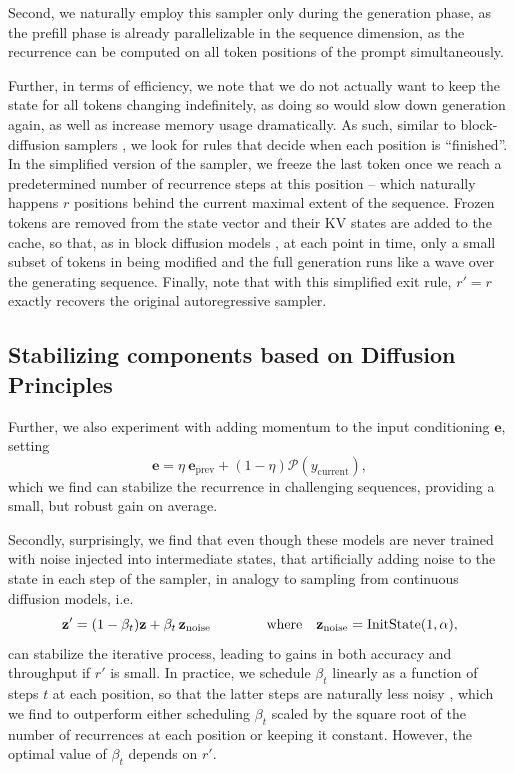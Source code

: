 \documentclass{article} %
\theoremstyle{definition}
\theoremstyle{plain}
\DeclareMathOperator{\InitState}{InitState}
\begin{document}
Second, we naturally employ this sampler only during the generation phase, as the prefill phase is already parallelizable in the sequence dimension, as the recurrence can be computed on all token positions of the prompt simultaneously.

Further, in terms of efficiency, we note that we do not actually want to keep the state for all tokens changing indefinitely, as doing so would slow down generation again, as well as increase memory usage dramatically. As such, similar to block-diffusion samplers \citep{arriola_block_2025}, we look for rules that decide when each position is ``finished''. In the simplified version of the sampler, we freeze the last token once we reach a predetermined number of recurrence steps at this position -- which naturally happens $r$ positions behind the current maximal extent of the sequence. Frozen tokens are removed from the state vector and their KV states are added to the cache, so that, as in block diffusion models \citep{arriola_block_2025}, at each point in time, only a small subset of tokens in being modified and the full generation runs like a wave over the generating sequence. Finally, note that with this simplified exit rule, $r'=r$ exactly recovers the original autoregressive sampler.

\subsection{Stabilizing components based on Diffusion Principles}
Further, we also experiment with adding momentum to the input conditioning $\mathbf{e}$, setting
\begin{equation}
    \mathbf{e} = \eta~\mathbf{e}_{\text{prev}} + (1-\eta) \mathcal{P}(y_\text{current}),
\end{equation}
which we find can stabilize the recurrence in challenging sequences, providing a small, but robust gain on average. 

Secondly, surprisingly, we find that even though these models are never trained with noise injected into intermediate states, that artificially adding noise to the state in each step of the sampler, in analogy to sampling from continuous diffusion models, i.e.
\begin{equation}
    \mathbf{z'} =  (1-\beta_t)\mathbf{z} + \beta_t\,\mathbf{z}_{\text{noise}} \qquad \qquad \textnormal{where}  \quad \mathbf{z}_{\text{noise}}=\InitState(1,\alpha),
\end{equation}
can stabilize the iterative process, leading to gains in both accuracy and throughput if $r'$ is small. In practice, we schedule $\beta_t$ linearly as a function of steps $t$ at each position, so that the latter steps are naturally less noisy \citep{chen_diffusion_2024}, which we find to outperform either scheduling $\beta_t$ scaled by the square root of the number of recurrences at each position or keeping it constant. However, the optimal value of $\beta_t$ depends on $r'$. 
\end{document}
